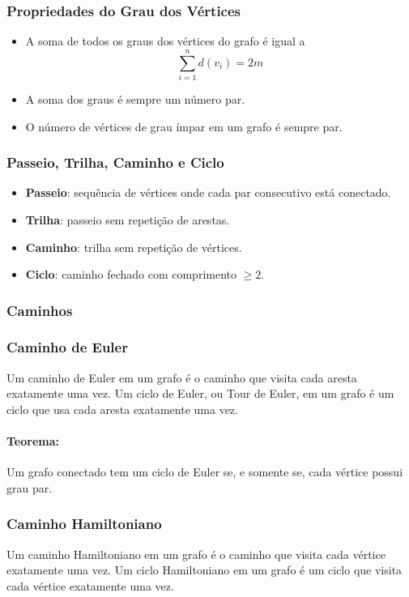 \subsubsection{Propriedades do Grau dos Vértices}
\begin{itemize}
    \item A soma de todos os graus dos vértices do grafo é igual a 
    \[
    \sum_{i=1}^{n} d(v_i) = 2m
    \]
    \item A soma dos graus é sempre um número par.
    \item O número de vértices de grau ímpar em um grafo é sempre par.
\end{itemize}

\subsubsection{Passeio, Trilha, Caminho e Ciclo}
\begin{itemize}
    \item \textbf{Passeio}: sequência de vértices onde cada par consecutivo está conectado.
    \item \textbf{Trilha}: passeio sem repetição de arestas.
    \item \textbf{Caminho}: trilha sem repetição de vértices.
    \item \textbf{Ciclo}: caminho fechado com comprimento $\ge2$.
\end{itemize}

\subsubsection{Caminhos}
\subsubsection*{Caminho de Euler} 
Um caminho de Euler em um grafo é o caminho que visita cada aresta exatamente uma vez. Um ciclo de Euler, ou Tour de Euler, em um grafo é um ciclo que usa cada aresta exatamente uma vez.

\paragraph{Teorema:} Um grafo conectado tem um ciclo de Euler se, e somente se, cada vértice possui grau par.

\subsubsection*{Caminho Hamiltoniano} 
Um caminho Hamiltoniano em um grafo é o caminho que visita cada vértice exatamente uma vez. Um ciclo Hamiltoniano em um grafo é um ciclo que visita cada vértice exatamente uma vez.

